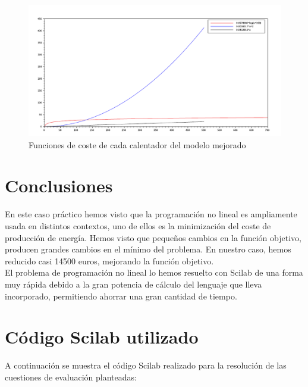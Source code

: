 \documentclass[12pt,a4paper,twoside,openright,titlepage,final]{article}
\begin{document}
\begin{figure}[tbph!]
\centering
\includegraphics[width=0.9\linewidth]{imagenes/funciones}
\caption{Funciones de coste de cada calentador del modelo mejorado}
\label{fig:funciones}
\end{figure}

\section{Conclusiones}

En este caso práctico hemos visto que la programación no lineal es ampliamente usada en distintos contextos, uno de ellos es la minimización del coste de producción de energía. Hemos visto que pequeños cambios en la función objetivo, producen grandes cambios en el mínimo del problema. En nuestro caso, hemos reducido casi 14500 euros, mejorando la función objetivo.\\

El problema de programación no lineal lo hemos resuelto con Scilab de una forma muy rápida debido a la gran potencia de cálculo del lenguaje que lleva incorporado, permitiendo ahorrar una gran cantidad de tiempo.

\clearpage

\section{Código Scilab utilizado}

A continuación se muestra el código Scilab realizado para la resolución de las cuestiones de evaluación planteadas:


\end{document}
